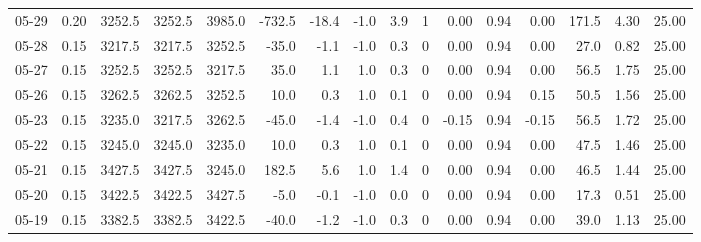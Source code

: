 \begin{threeparttable}
{\begin{tabular}{lrrrrrrrrrrrrrrr}
  05-29 &     0.20 & 3252.5 & 3252.5 & 3985.0 &     -732.5 &          -18.4 &                     -1.0 &                 3.9 &              1 &       0.00 &      0.94 &           0.00 &            171.5 &            4.30 &                  25.00 \\
  05-28 &     0.15 & 3217.5 & 3217.5 & 3252.5 &      -35.0 &           -1.1 &                     -1.0 &                 0.3 &              0 &       0.00 &      0.94 &           0.00 &             27.0 &            0.82 &                  25.00 \\
  05-27 &     0.15 & 3252.5 & 3252.5 & 3217.5 &       35.0 &            1.1 &                      1.0 &                 0.3 &              0 &       0.00 &      0.94 &           0.00 &             56.5 &            1.75 &                  25.00 \\
  05-26 &     0.15 & 3262.5 & 3262.5 & 3252.5 &       10.0 &            0.3 &                      1.0 &                 0.1 &              0 &       0.00 &      0.94 &           0.15 &             50.5 &            1.56 &                  25.00 \\
  05-23 &     0.15 & 3235.0 & 3217.5 & 3262.5 &      -45.0 &           -1.4 &                     -1.0 &                 0.4 &              0 &      -0.15 &      0.94 &          -0.15 &             56.5 &            1.72 &                  25.00 \\
  05-22 &     0.15 & 3245.0 & 3245.0 & 3235.0 &       10.0 &            0.3 &                      1.0 &                 0.1 &              0 &       0.00 &      0.94 &           0.00 &             47.5 &            1.46 &                  25.00 \\
  05-21 &     0.15 & 3427.5 & 3427.5 & 3245.0 &      182.5 &            5.6 &                      1.0 &                 1.4 &              0 &       0.00 &      0.94 &           0.00 &             46.5 &            1.44 &                  25.00 \\
  05-20 &     0.15 & 3422.5 & 3422.5 & 3427.5 &       -5.0 &           -0.1 &                     -1.0 &                 0.0 &              0 &       0.00 &      0.94 &           0.00 &             17.3 &            0.51 &                  25.00 \\
  05-19 &     0.15 & 3382.5 & 3382.5 & 3422.5 &      -40.0 &           -1.2 &                     -1.0 &                 0.3 &              0 &       0.00 &      0.94 &           0.00 &             39.0 &            1.13 &                  25.00 \\

\end{tabular}}
\end{threeparttable}
